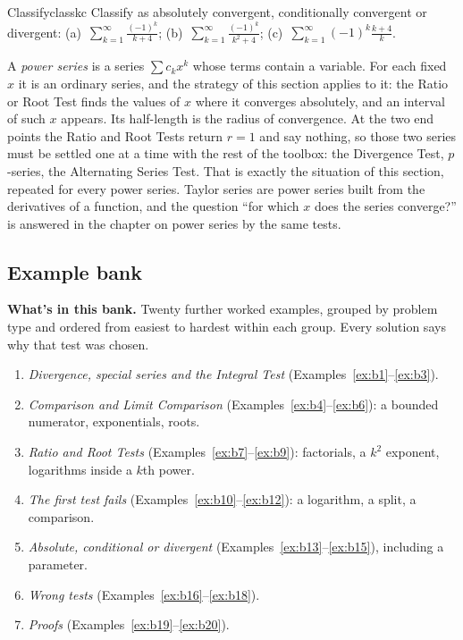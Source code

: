 \documentclass[11pt]{article}
\begin{document}
\begin{kc}{Classify}{classkc}
Classify as absolutely convergent, conditionally convergent or divergent: (a)~$\displaystyle\sum_{k=1}^\infty\frac{(-1)^k}{k+4}$; \quad (b)~$\displaystyle\sum_{k=1}^\infty\frac{(-1)^k}{k^2+4}$; \quad (c)~$\displaystyle\sum_{k=1}^\infty(-1)^k\frac{k+4}{k}$.
\end{kc}

\begin{remark}
A \emph{power series} is a series $\sum c_kx^k$ whose terms contain a variable. For each fixed $x$ it is an ordinary series, and the strategy of this section applies to it: the Ratio or Root Test finds the values of $x$ where it converges absolutely, and an interval of such $x$ appears. Its half-length is the radius of convergence. At the two end points the Ratio and Root Tests return $r=1$ and say nothing, so those two series must be settled one at a time with the rest of the toolbox: the Divergence Test, $p$-series, the Alternating Series Test. That is exactly the situation of this section, repeated for every power series. Taylor series are power series built from the derivatives of a function, and the question ``for which $x$ does the series converge?'' is answered in the chapter on power series by the same tests.
\end{remark}

\subsection*{Example bank}

\textbf{What's in this bank.} Twenty further worked examples, grouped by problem type and ordered from easiest to hardest within each group. Every solution says why that test was chosen.
\begin{enumerate}[nosep]
  \item \emph{Divergence, special series and the Integral Test} (Examples~\ref{ex:b1}--\ref{ex:b3}).
  \item \emph{Comparison and Limit Comparison} (Examples~\ref{ex:b4}--\ref{ex:b6}): a bounded numerator, exponentials, roots.
  \item \emph{Ratio and Root Tests} (Examples~\ref{ex:b7}--\ref{ex:b9}): factorials, a $k^2$ exponent, logarithms inside a $k$th power.
  \item \emph{The first test fails} (Examples~\ref{ex:b10}--\ref{ex:b12}): a logarithm, a split, a comparison.
  \item \emph{Absolute, conditional or divergent} (Examples~\ref{ex:b13}--\ref{ex:b15}), including a parameter.
  \item \emph{Wrong tests} (Examples~\ref{ex:b16}--\ref{ex:b18}).
  \item \emph{Proofs} (Examples~\ref{ex:b19}--\ref{ex:b20}).
\end{enumerate}
\end{document}
